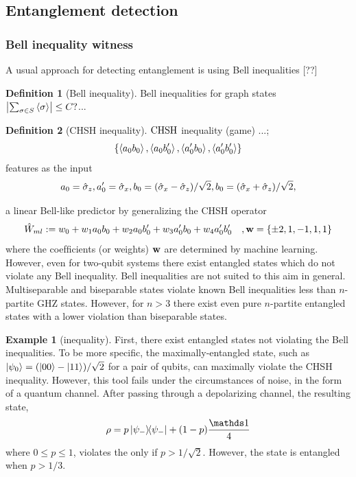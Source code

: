 \documentclass[
10pt,
aps,
pra,
linenumbers,
floatfix,
]{revtex4-2}
\theoremstyle{plain}
\theoremstyle{definition}
\newtheorem{definition}{Definition}
\newtheorem{example}{Example}
\newtheorem{remark}{Remark}
\newcommand{\ew}{\hat{W}}
\newcommand{\chsh}{\textup{CHSH}}
\newcommand{\dm}{\rho}
\begin{document}
\subsection{Entanglement detection}


\subsubsection{Bell inequality witness}
A usual approach for detecting entanglement is using Bell inequalities [??]
\begin{definition}[Bell inequality]\label{def:bell_inequality}
	Bell inequalities for graph states $\abs{\sum_{\sigma\in S} \expval{\sigma}}\le C?$...
\end{definition}
\begin{definition}[CHSH inequality]\label{def:chsh_inequality}
	$\chsh$ inequality (game) ...; 
	\begin{equation}
		\qty{\expval{a_0 b_0}, \expval{a_0 b_0'}, \expval{a_0' b_0}, \expval{a_0' b_0'} }
	\end{equation}
	features as the input 
	\begin{equation}
		a_0 = \hat{\sigma}_z, a_0' = \hat{\sigma}_x, 
		b_0 = (\hat{\sigma}_x-\hat{\sigma}_z)/\sqrt{2},
		b_0 = (\hat{\sigma}_x+\hat{\sigma}_z)/\sqrt{2},
	\end{equation}
\end{definition}
a linear Bell-like predictor by generalizing the CHSH operator
\begin{equation}
	\ew_{ml} := w_0 + w_1 a_0 b_0 +  w_2 a_0 b_0' +  w_3 a_0' b_0 +  w_4 a_0' b_0'
	\quad, \vb{w} = \qty{\pm 2, 1, -1, 1, 1}
\end{equation}
where the coefﬁcients (or weights) $\vb{w}$ are determined by machine learning.
However, even for two-qubit systems there exist entangled states which do not violate any Bell inequality.
Bell inequalities are not suited to this aim in general. Multiseparable and biseparable states violate known Bell inequalities less than $n$-partite GHZ states. However, for $n > 3$ there exist even pure $n$-partite entangled states with a lower violation than biseparable states. \cite{bourennaneWitnessingMultipartiteEntanglement2004}
\begin{example}[inequality]
	\cite{maTransformingBellInequalities2018}
	First, there exist entangled states not violating the Bell inequalities. 
	To be more speciﬁc, the maximally-entangled state, such as $\ket{\psi_0} = ( \ket{00} - \ket{11} ) / \sqrt{2}$ for a pair of qubits, can maximally violate the CHSH inequality. 
	However, this tool fails under the circumstances of noise, in the form of a quantum channel. After passing through a depolarizing channel, the resulting state,	
	\begin{equation}
		\dm = p \op{\psi_-} + (1 - p) \frac{\identity}{4}
	\end{equation}
	where $0 \le p \le 1$, violates the  only if $p > 1/ \sqrt{2}$. However, the state is entangled when $p > 1/3$.
\end{example}
\end{document}
